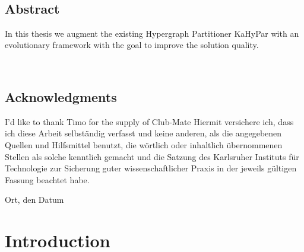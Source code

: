 \documentclass[a4paper,12pt,bibtotoc,titlepage, liststotoc,BCOR7mm,headsepline,pointlessnumbers]{scrbook}
\numberwithin{equation}{section}
\begin{document}

\ 
\newpage
\clearpage

\section*{Abstract}
In this thesis we augment the existing Hypergraph Partitioner KaHyPar with an evolutionary framework with the goal to improve the 
solution quality.
\vfill\vfill\vfill
\ 
\newpage
\clearpage
\ 
\newpage
\clearpage

\section*{Acknowledgments}

I'd like to thank Timo for the supply of Club-Mate
\vfill\vfill\vfill
Hiermit versichere ich, dass ich diese Arbeit selbständig verfasst und keine anderen, als die angegebenen Quellen und Hilfsmittel benutzt, die wörtlich oder inhaltlich übernommenen Stellen als solche kenntlich gemacht und die Satzung des Karlsruher Instituts für Technologie zur Sicherung guter wissenschaftlicher Praxis in der jeweils gültigen Fassung beachtet habe.

\bigskip
\vspace*{1cm}
\noindent
Ort, den Datum

\clearpage

\tableofcontents
\clearpage
\clearpage
\mainmatter
\pagestyle{plain}
\chapter{Introduction}
\pagestyle{headings}
\end{document}
